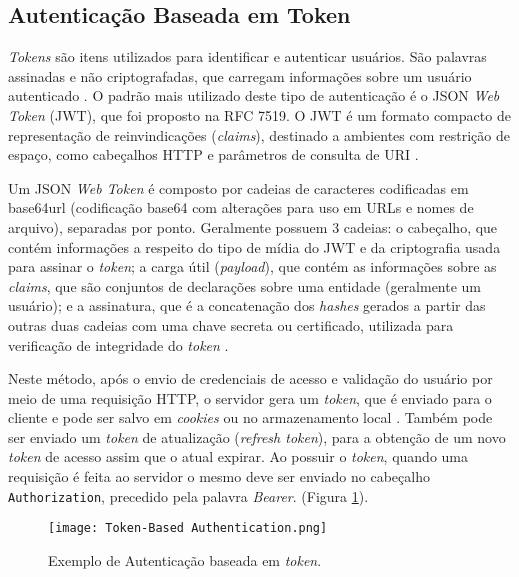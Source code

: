 \subsection{Autenticação Baseada em Token}

\emph{Tokens} são itens utilizados para identificar e autenticar usuários. São palavras assinadas e 
não criptografadas, que carregam informações sobre um usuário autenticado \cite{BALAJ2017}. O 
padrão mais utilizado deste tipo de autenticação é o JSON \emph{Web Token} (JWT), que foi proposto
na RFC 7519. O JWT é um formato compacto de representação de reinvindicações (\emph{claims}), 
destinado a ambientes com restrição de espaço, como cabeçalhos HTTP e parâmetros de consulta de URI 
\cite{RFC7519}.

Um JSON \emph{Web Token} é composto por cadeias de caracteres codificadas em base64url (codificação
base64 com alterações para uso em URLs e nomes de arquivo), separadas 
por ponto. Geralmente possuem 3 cadeias: o cabeçalho, que contém informações a respeito do tipo de mídia do 
JWT e da criptografia usada para assinar o \emph{token}; a carga útil (\emph{payload}), que contém 
as informações sobre as \emph{claims}, que são conjuntos de declarações sobre uma entidade 
(geralmente um usuário); e a assinatura, que é a concatenação dos \emph{hashes} gerados a partir das 
outras duas cadeias com uma chave secreta ou certificado, utilizada para verificação de integridade
do \emph{token} \cite{MONTANHEIRO2017}.

Neste método, após o envio de credenciais de acesso e validação do usuário por meio de uma 
requisição HTTP, o servidor gera um \emph{token}, que é enviado para o cliente e pode ser salvo
em \emph{cookies} ou no armazenamento local \cite{MONTANHEIRO2017}. Também pode ser enviado um 
\emph{token} de atualização (\emph{refresh token}), para a obtenção de um novo \emph{token} de acesso
assim que o atual expirar. Ao possuir o \emph{token}, quando uma requisição é feita ao servidor o 
mesmo deve ser enviado no cabeçalho \texttt{Authorization}, precedido pela palavra \emph{Bearer}. 
\cite{RFC6749} (Figura \ref{fig:tokenAuth}).

\begin{figure}[ht]
  \centering
  \texttt{[image: Token-Based Authentication.png]}
  \caption{Exemplo de Autenticação baseada em \emph{token}.}
  \label{fig:tokenAuth}
\end{figure}

\

\